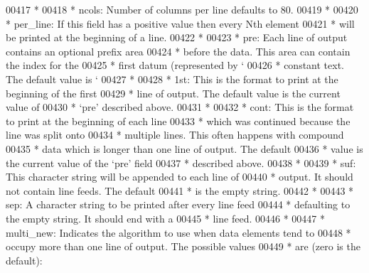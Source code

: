 \begin{DoxyCode}
{{{{{{{{{{{{{{{{{00417 \textcolor{comment}{     *}
00418 \textcolor{comment}{     *   ncols:     Number of columns per line defaults to 80.}
00419 \textcolor{comment}{     *}
00420 \textcolor{comment}{     *   per\_line:  If this field has a positive value then every Nth element}
00421 \textcolor{comment}{     *              will be printed at the beginning of a line.}
00422 \textcolor{comment}{     *}
00423 \textcolor{comment}{     *   pre:       Each line of output contains an optional prefix area}
00424 \textcolor{comment}{     *              before the data. This area can contain the index for the}
00425 \textcolor{comment}{     *              first datum (represented by `%
00426 \textcolor{comment}{     *              constant text.  The default value is `%
00427 \textcolor{comment}{     *}
00428 \textcolor{comment}{     *   1st:       This is the format to print at the beginning of the first}
00429 \textcolor{comment}{     *              line of output. The default value is the current value of}
00430 \textcolor{comment}{     *              `pre' described above.}
00431 \textcolor{comment}{     *}
00432 \textcolor{comment}{     *   cont:      This is the format to print at the beginning of each line}
00433 \textcolor{comment}{     *              which was continued because the line was split onto}
00434 \textcolor{comment}{     *              multiple lines. This often happens with compound}
00435 \textcolor{comment}{     *              data which is longer than one line of output. The default}
00436 \textcolor{comment}{     *              value is the current value of the `pre' field}
00437 \textcolor{comment}{     *              described above.}
00438 \textcolor{comment}{     *}
00439 \textcolor{comment}{     *   suf:       This character string will be appended to each line of}
00440 \textcolor{comment}{     *              output.  It should not contain line feeds.  The default}
00441 \textcolor{comment}{     *              is the empty string.}
00442 \textcolor{comment}{     *}
00443 \textcolor{comment}{     *   sep:       A character string to be printed after every line feed}
00444 \textcolor{comment}{     *              defaulting to the empty string.  It should end with a}
00445 \textcolor{comment}{     *              line feed.}
00446 \textcolor{comment}{     *}
00447 \textcolor{comment}{     *   multi\_new: Indicates the algorithm to use when data elements tend to}
00448 \textcolor{comment}{     *              occupy more than one line of output. The possible values}
00449 \textcolor{comment}{     *              are (zero is the default):}
}}}}}}}}}}}}}}}}}}}
\end{DoxyCode}
